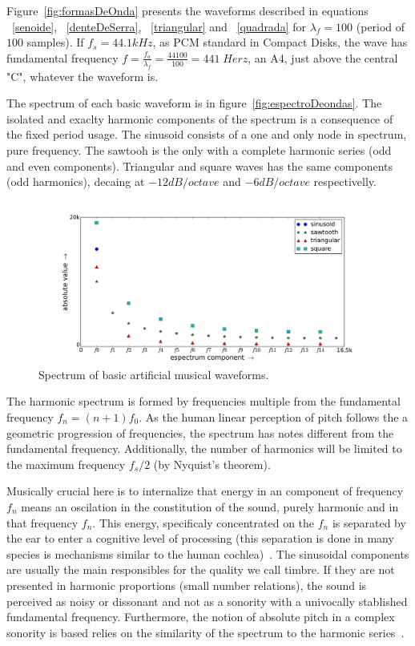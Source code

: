 \documentclass[
 aip,
 jmp,
 amsmath,amssymb,
 reprint,
]{revtex4-1}
\begin{document}
Figure~\ref{fig:formasDeOnda} presents the waveforms described in equations  ~\ref{senoide}, ~\ref{denteDeSerra}, ~\ref{triangular} and ~\ref{quadrada} for $\lambda_f=100$ (period of $100$ samples). If $f_s=44.1kHz$, as PCM standard in Compact Disks, the wave has fundamental frequency $f=\frac{f_a}{\lambda_f}=\frac{44100}{100} = 441 \; Herz$, an A4, just above the central "C", whatever the waveform is.

The spectrum of each basic waveform is in figure~\ref{fig:espectroDeondas}. The isolated and exaclty harmonic components of the spectrum is a consequence of the fixed period usage. The sinusoid consists of a one and only node in spectrum, pure frequency. The sawtooh is the only with a complete harmonic series (odd and even components). Triangular and square waves has the same components (odd harmonics), decaing at $-12dB/octave$ and $-6dB/octave$ respectivelly.

\begin{figure}
    \centering
        \includegraphics[width=\textwidth]{figures/waveSpectrum}
    \caption{Spectrum of basic artificial musical waveforms.}
        \label{fig:espectroDeOndas}
\end{figure}

The harmonic spectrum is formed by frequencies multiple from the fundamental frequency $f_n=(n+1)f_0$. As the human linear perception of pitch follows the a geometric progression of frequencies, the spectrum has notes different from the fundamental frequency. Additionally, the number of harmonics will be limited to the maximum frequency $f_s/2$ (by Nyquist's theorem).

Musically crucial here is to internalize that energy in an component of frequency $f_n$ means an oscilation in the constitution of the sound, purely harmonic and in that frequency $f_n$. This energy, specificaly concentrated on the $f_n$ is separated by the ear to enter a cognitive level of processing (this separation is done in many species is mechanisms similar to the human cochlea)~\cite{Roederer}.
The sinusoidal components are usually the main responsibles for the quality we call timbre. If they are not presented in harmonic proportions (small number relations), the sound is perceived as noisy or dissonant and not as a sonority with a univocally stablished fundamental frequency. Furthermore, the notion of absolute pitch in a complex sonority is based relies on the similarity of the spectrum to the harmonic series~\cite{Roederer}.
\end{document}
